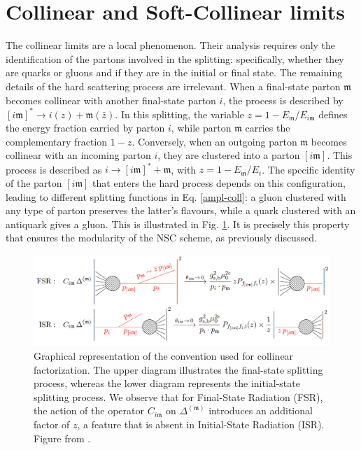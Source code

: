 \documentclass[a4paper, 12pt]{book}
\newcommand{\um}{\mathfrak{m}}
\begin{document}
\section{Collinear and Soft-Collinear limits}
\label{section-coll-soft}
The collinear limits are a local phenomenon. Their analysis requires only the identification of the partons involved in the splitting: specifically, whether they are quarks or gluons and if they are in the initial or final state. The remaining details of the hard scattering process are irrelevant. When a final-state parton $\um$ becomes collinear with another final-state parton $i$, the process is described by $[i\um]^* \to i(z) + \um(\bar{z})$. In this splitting, the variable $z = 1 - E_{\um}/E_{i\um}$ defines the energy fraction carried by parton $i$, while parton $\um$ carries the complementary fraction $1-z$. Conversely, when an outgoing parton $\um$ becomes collinear with an incoming parton $i$, they are clustered into a parton $[i\um]$. This process is described as $i \to [i\um]^* + \um$, with $z = 1 - E_{\um}/E_i$. The specific identity of the parton $[i\um]$ that enters the hard process depends on this configuration, leading to different splitting functions in Eq. \ref{ampl-coll}: a gluon clustered with any type of parton preserves the latter's flavours, while a quark clustered with an antiquark gives a gluon. This is illustrated in Fig. \ref{hadron-collision-pict}. It is precisely this property that ensures the modularity of the NSC scheme, as previously discussed. 

\begin{figure}[!ht]
	\centering
	\includegraphics[width=1.0\textwidth]{imgs/splitting.png}
	\caption{Graphical representation of the convention used for collinear factorization. The upper diagram illustrates the final-state splitting process, whereas the lower diagram represents the initial-state splitting process. We observe that for Final-State Radiation (FSR), the action of the operator $C_{i\um}$ on $\Delta^{(\um)}$ introduces an additional factor of $z$, a feature that is absent in Initial-State Radiation (ISR). Figure from \cite{Devoto:2025kin}.}
	\label{hadron-collision-pict}
\end{figure}
\end{document}
